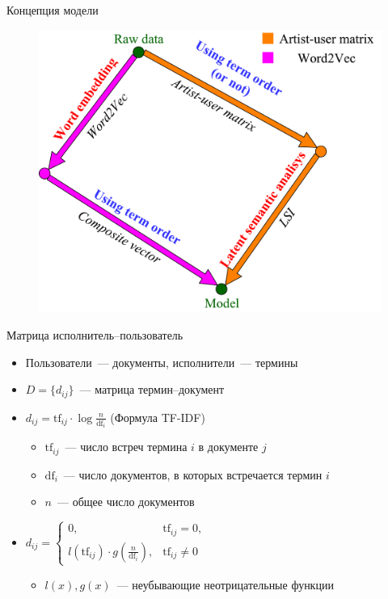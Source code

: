 \documentclass{beamer}
\begin{document}
\begin{frame}{Концепция модели}
    \begin{figure}
        \includegraphics[scale=0.40]{figures/concept.pdf}
    \end{figure}
\end{frame}

\begin{frame}{Матрица исполнитель--пользователь}
  \begin{itemize}
      \item {Пользователи~--- документы, исполнители~--- термины}
      \item {$D = \{d_{ij}\}$~--- матрица термин--документ}
      \item {$d_{ij} = \mathrm{tf}_{ij} \cdot \log{\frac{n}{\mathrm{df}_{i}}}$ (Формула TF-IDF)}
          \begin{itemize}
              \item $\mathrm{tf}_{ij}$~--- число встреч термина $i$ в документе $j$
              \item $\mathrm{df}_{i}$~--- число документов, в которых встречается термин $i$
              \item $n$~--- общее число документов
          \end{itemize}
      \item {$d_{ij} = \begin{cases}
          0,& \mathrm{tf}_{ij} = 0,\\
          l(\mathrm{tf}_{ij}) \cdot g(\frac{n}{\mathrm{df}_{i}}),& \mathrm{tf}_{ij} \ne 0
      \end{cases}$}
          \begin{itemize}
              \item {$l(x), g(x)$~--- неубывающие неотрицательные функции}
          \end{itemize}
  \end{itemize}
\end{frame}
\end{document}
